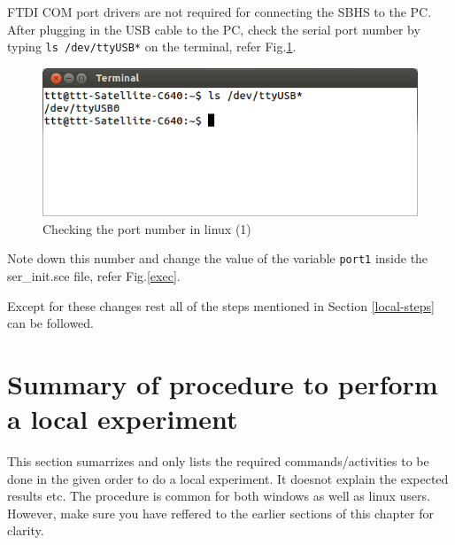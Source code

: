 FTDI COM port drivers are not required for connecting the SBHS to the PC. After plugging in the USB cable to the PC, check the serial port number by typing {\tt ls /dev/ttyUSB*} on the terminal, refer Fig.\ref{lstty}.
\begin{figure}
\centering
\includegraphics[width=0.7\linewidth]{using-sbhs/lstty.png}
\caption{Checking the port number in linux (1)}
\label{lstty}
\end{figure}

Note down this number and change the value of the variable {\tt port1} inside the {ser\_init.sce} file, refer Fig.\ref{exec}. 

 Except for these changes rest all of the steps mentioned in Section \ref{local-steps} can be followed.
\section{Summary of procedure to perform a local experiment}\label{local-summary}
This section sumarrizes and only lists the required commands/activities to be done in the given order to do a local experiment. It doesnot explain the expected results etc. The procedure is common for both windows as well as linux users. However, make sure you have reffered to the earlier sections of this chapter for clarity.

